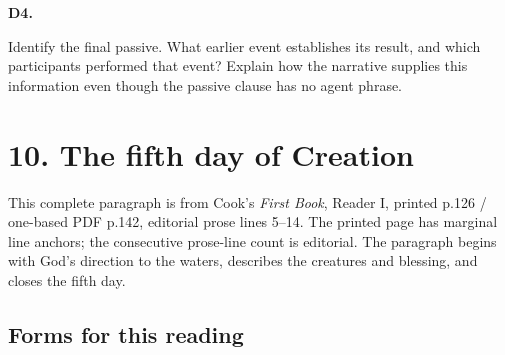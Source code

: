 \par\begin{minipage}{\linewidth}\raggedright
\textbf{D4.}

Identify the final passive. What earlier event establishes its result, and which participants performed that event? Explain how the narrative supplies this information even though the passive clause has no agent phrase.

\end{minipage}\par\addvspace{4pt}

\section*{10. The fifth day of Creation}

This complete paragraph is from Cook’s \emph{First Book}, Reader I, printed p.126 /\allowbreak{} one-based PDF p.142, editorial prose lines 5–14. The printed page has marginal line anchors; the consecutive prose-line count is editorial. The paragraph begins with God’s direction to the waters, describes the creatures and blessing, and closes the fifth day.

\par\begin{minipage}{\linewidth}\raggedright
{}
\end{minipage}\par

\subsection*{Forms for this reading}

